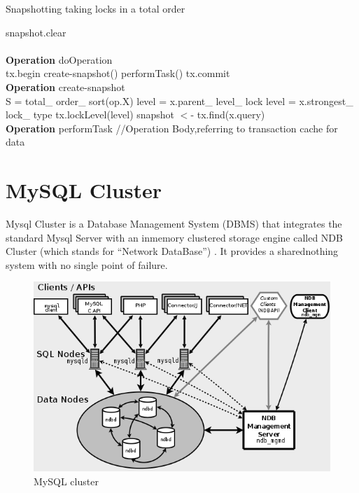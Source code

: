 \begin{algorithm}[h]
\caption{Snapshotting taking locks in a total order}
\label{hopAlgo}
\begin{algorithmic}

\State snapshot.clear \\ \\

\textbf{Operation } doOperation \\

\State tx.begin
\State create-snapshot()
\State performTask()
\State tx.commit\\

\State \textbf{Operation} create-snapshot \\
\State S = total\_ order\_ sort(op.X) 
\State level = x.parent\_ level\_ lock
\Else
\State level = x.strongest\_ lock\_ type
\State tx.lockLevel(level)
\State snapshot $<$- tx.find(x.query)
\EndIf
\EndFor
 \\ 
\State \textbf{Operation} performTask
\State //Operation Body,referring to transaction cache for data

\end{algorithmic}
\end{algorithm}

\section{MySQL Cluster}
Mysql  Cluster  is   a  Database  Management  System   (DBMS)  that  integrates   the  standard
Mysql  Server with an inmemory  clustered storage engine called NDB Cluster (which stands
for  “Network   DataBase”)  .  It  provides   a  sharednothing  system   with  no  single
point of failure.

\begin{figure}[hb]
\centering  
 \includegraphics[scale=0.75]{figs/preliminar/mysql_cluster.png}
  \caption{MySQL cluster}
  \label{fig:mysqlCluster}
\end{figure}


